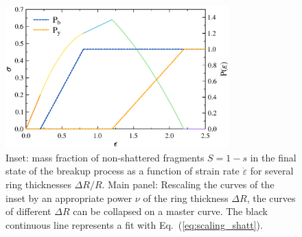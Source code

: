 \documentclass{article}
\begin{document}
\begin{figure}[h] 
    \centering\includegraphics[width=3.4in]{constit4.eps}
    \caption{\label{fig:dust} Inset: mass fraction of non-shattered fragments $S=1-s$ in the final state of the breakup process as a function of strain rate $\dot{\varepsilon}$ for several ring thicknesses $\Delta R/R$. Main panel: Rescaling the curves of the inset by an appropriate power $\nu$ of the ring thickness $\Delta R$, the curves of different $\Delta R$ can be collapsed on a master curve. The black continuous line represents a fit with Eq.\ (\ref{eq:scaling_shatt}). 
    }
\end{figure}
\end{document}
